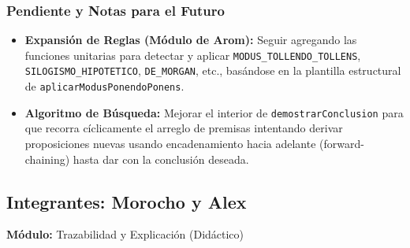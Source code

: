 \documentclass[11pt,a4paper,openany]{book}
\begin{document}
\subsubsection{Pendiente y Notas para el Futuro}
\begin{itemize}[leftmargin=*]
\item \textbf{Expansión de Reglas (Módulo de Arom):} Seguir agregando las funciones unitarias para detectar y aplicar \texttt{MODUS\_TOLLENDO\_TOLLENS}, \texttt{SILOGISMO\_HIPOTETICO}, \texttt{DE\_MORGAN}, etc., basándose en la plantilla estructural de \texttt{aplicarModusPonendoPonens}.
\item \textbf{Algoritmo de Búsqueda:} Mejorar el interior de \texttt{demostrarConclusion} para que recorra cíclicamente el arreglo de premisas intentando derivar proposiciones nuevas usando encadenamiento hacia adelante (forward-chaining) hasta dar con la conclusión deseada.
\end{itemize}

\subsection{Integrantes: Morocho y Alex}
\textbf{Módulo:} Trazabilidad y Explicación (Didáctico)
\end{document}
